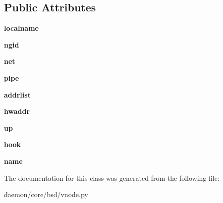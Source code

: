 \subsection*{Public Attributes}
\begin{DoxyCompactItemize}
\item 
\hypertarget{classcore_1_1bsd_1_1vnode_1_1_v_eth_ac7331d31471cafccb96f1e398d2b25df}{{\bfseries localname}}\label{classcore_1_1bsd_1_1vnode_1_1_v_eth_ac7331d31471cafccb96f1e398d2b25df}

\item 
\hypertarget{classcore_1_1bsd_1_1vnode_1_1_v_eth_a30d566578cf271a2cf2ae7b92b2b8233}{{\bfseries ngid}}\label{classcore_1_1bsd_1_1vnode_1_1_v_eth_a30d566578cf271a2cf2ae7b92b2b8233}

\item 
\hypertarget{classcore_1_1bsd_1_1vnode_1_1_v_eth_afe38485b30b4968f5df971c8b45001fa}{{\bfseries net}}\label{classcore_1_1bsd_1_1vnode_1_1_v_eth_afe38485b30b4968f5df971c8b45001fa}

\item 
\hypertarget{classcore_1_1bsd_1_1vnode_1_1_v_eth_a94f0cbf3ecbdbf642e2a312b1fb37c53}{{\bfseries pipe}}\label{classcore_1_1bsd_1_1vnode_1_1_v_eth_a94f0cbf3ecbdbf642e2a312b1fb37c53}

\item 
\hypertarget{classcore_1_1bsd_1_1vnode_1_1_v_eth_a46167f34553a2d0c5a387b202270f2ef}{{\bfseries addrlist}}\label{classcore_1_1bsd_1_1vnode_1_1_v_eth_a46167f34553a2d0c5a387b202270f2ef}

\item 
\hypertarget{classcore_1_1bsd_1_1vnode_1_1_v_eth_a268a7b4f19a00de50bba7a74be6e7893}{{\bfseries hwaddr}}\label{classcore_1_1bsd_1_1vnode_1_1_v_eth_a268a7b4f19a00de50bba7a74be6e7893}

\item 
\hypertarget{classcore_1_1bsd_1_1vnode_1_1_v_eth_af6fc89e66e65bf4e6cbad13b4b2016af}{{\bfseries up}}\label{classcore_1_1bsd_1_1vnode_1_1_v_eth_af6fc89e66e65bf4e6cbad13b4b2016af}

\item 
\hypertarget{classcore_1_1bsd_1_1vnode_1_1_v_eth_a1a7f79f223931690dbaadfb73f9d3a1d}{{\bfseries hook}}\label{classcore_1_1bsd_1_1vnode_1_1_v_eth_a1a7f79f223931690dbaadfb73f9d3a1d}

\item 
\hypertarget{classcore_1_1bsd_1_1vnode_1_1_v_eth_aec9627502363e21a02b5901f8635d224}{{\bfseries name}}\label{classcore_1_1bsd_1_1vnode_1_1_v_eth_aec9627502363e21a02b5901f8635d224}

\end{DoxyCompactItemize}


The documentation for this class was generated from the following file\+:\begin{DoxyCompactItemize}
\item 
daemon/core/bsd/vnode.\+py\end{DoxyCompactItemize}
